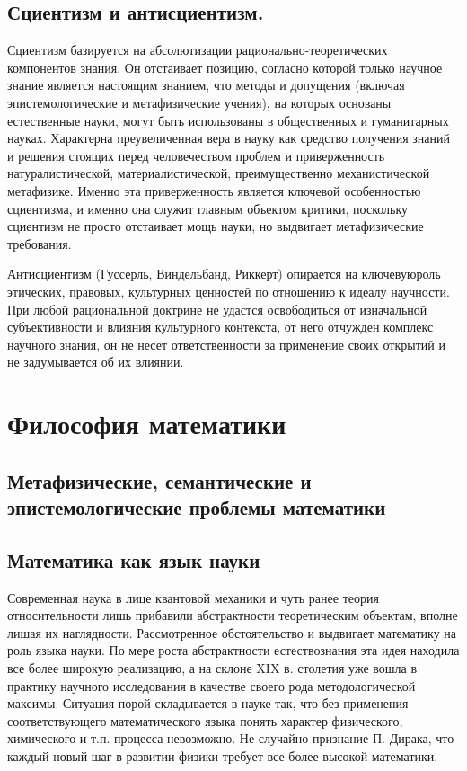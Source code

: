 \documentclass[12pt, specialist, subf, substylefile = spbu.rtx]{disser}
\begin{document}
\section{Сциентизм и антисциентизм.}
Сциентизм базируется на абсолютизации рационально-теоретических компонентов знания. Он отстаивает позицию, согласно которой только научное знание является настоящим знанием, что методы и допущения (включая эпистемологические и метафизические учения), на которых основаны естественные науки, могут быть использованы в общественных и гуманитарных науках. Характерна преувеличенная вера в науку как средство получения знаний и решения стоящих перед человечеством проблем и приверженность натуралистической, материалистической, преимущественно механистической метафизике. Именно эта приверженность является ключевой особенностью сциентизма, и именно она служит главным объектом критики, поскольку сциентизм не просто отстаивает мощь науки, но выдвигает метафизические требования.

Антисциентизм (Гуссерль, Виндельбанд, Риккерт) опирается на ключевуюроль этических, правовых, культурных ценностей по отношению к идеалу научности. При любой рациональной доктрине не удастся освободиться от изначальной субъективности и влияния культурного контекста, от него отчужден комплекс научного знания, он не несет ответственности за применение своих открытий и не задумывается об их влиянии.



\chapter{Философия математики}
\section{Метафизические, семантические и эпистемологические проблемы математики}
\section{Математика как язык науки}
Современная наука в лице квантовой механики и чуть ранее теория относительности лишь прибавили абстрактности теоретическим объектам, вполне лишая их наглядности. Рассмотренное обстоятельство и выдвигает математику на роль языка науки. 
По мере роста абстрактности естествознания эта идея находила все более широкую реализацию, а на склоне XIX в. столетия уже вошла в практику научного исследования в качестве своего рода методологической максимы.
Ситуация порой складывается в науке так, что без применения соответствующего математического языка понять характер физического, химического и т.п. процесса невозможно. Не случайно признание П. Дирака, что каждый новый шаг в развитии физики требует все более высокой математики. 
\end{document}
